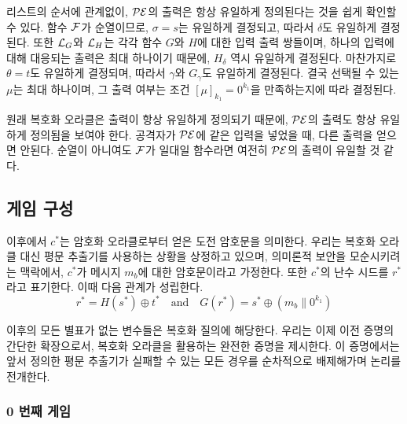 리스트의 순서에 관계없이, $\mathcal{PE}$의 출력은 항상 유일하게 정의된다는 것을 쉽게
확인할 수 있다. 함수 $\mathcal{F}$가 순열이므로, $\sigma = s$는 유일하게 결정되고, 따라서
$\delta$도 유일하게 결정된다. 또한 $\mathcal{L}_{G}$와 $\mathcal{L}_{H}$는 각각 함수 $G$와 $H$에
대한 입력 출력 쌍들이며, 하나의 입력에 대해 대응되는 출력은 최대 하나이기
때문에, $H_\delta$ 역시 유일하게 결정된다. 마찬가지로 $\theta = t$도 유일하게
결정되며, 따라서 $\gamma$와 $G_\gamma$도 유일하게 결정된다. 결국 선택될 수 있는
$\mu$는 최대 하나이며, 그 출력 여부는 조건 $[\mu]_{k_1} = 0^{k_1}$을
만족하는지에 따라 결정된다.

\begin{memo}
	원래 복호화 오라클은 출력이 항상 유일하게 정의되기 때문에, $\mathcal{PE}$의 출력도
	항상 유일하게 정의됨을 보여야 한다. 공격자가 $\mathcal{PE}$에 같은 입력을 넣었을 때,
	다른 출력을 얻으면 안된다. 순열이 아니여도 $\mathcal{F}$가 일대일 함수라면 여전히
	$\mathcal{PE}$의 출력이 유일할 것 같다.
\end{memo}

\newpage
\subsection{게임 구성}

이후에서 $c^*$는 암호화 오라클로부터 얻은 도전 암호문을 의미한다. 우리는 복호화
오라클 대신 평문 추출기를 사용하는 상황을 상정하고 있으며, 의미론적 보안을
모순시키려는 맥락에서, $c^*$가 메시지 $m_b$에 대한 암호문이라고 가정한다. 또한
$c^*$의 난수 시드를 $r^*$라고 표기한다. 이때 다음 관계가 성립한다.
$$
	r^* = H(s^*) \oplus t^* \quad \text{and} \quad G(r^*) = s^* \oplus (m_b \parallel 0^{k_1})
$$

이후의 모든 별표가 없는 변수들은 복호화 질의에 해당한다. 우리는 이제 이전 증명의
간단한 확장으로서, 복호화 오라클을 활용하는 완전한 증명을 제시한다. 이
증명에서는 앞서 정의한 평문 추출기가 실패할 수 있는 모든 경우를 순차적으로
배제해가며 논리를 전개한다.

\subsubsection{0 번째 게임}

